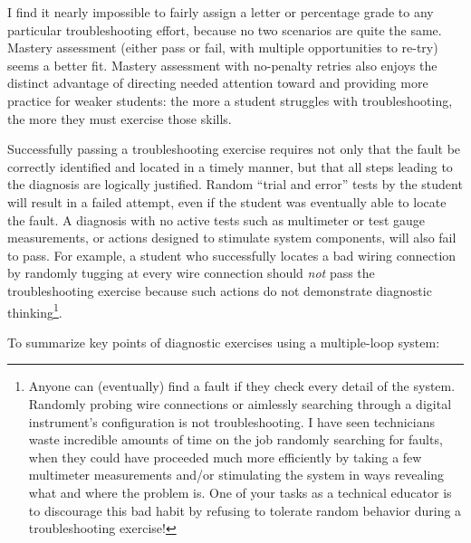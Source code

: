 I find it nearly impossible to fairly assign a letter or percentage grade to any particular troubleshooting effort, because no two scenarios are quite the same.  Mastery assessment (either pass or fail, with multiple opportunities to re-try) seems a better fit.  Mastery assessment with no-penalty retries also enjoys the distinct advantage of directing needed attention toward and providing more practice for weaker students: the more a student struggles with troubleshooting, the more they must exercise those skills.  

Successfully passing a troubleshooting exercise requires not only that the fault be correctly identified and located in a timely manner, but that all steps leading to the diagnosis are logically justified.  Random ``trial and error'' tests by the student will result in a failed attempt, even if the student was eventually able to locate the fault.  A diagnosis with no active tests such as multimeter or test gauge measurements, or actions designed to stimulate system components, will also fail to pass.  For example, a student who successfully locates a bad wiring connection by randomly tugging at every wire connection should \textit{not} pass the troubleshooting exercise because such actions do not demonstrate diagnostic thinking\footnote{Anyone can (eventually) find a fault if they check every detail of the system.  Randomly probing wire connections or aimlessly searching through a digital instrument's configuration is not troubleshooting.  I have seen technicians waste incredible amounts of time on the job randomly searching for faults, when they could have proceeded much more efficiently by taking a few multimeter measurements and/or stimulating the system in ways revealing what and where the problem is.  One of your tasks as a technical educator is to discourage this bad habit by refusing to tolerate random behavior during a troubleshooting exercise!}.

\vskip 10pt

To summarize key points of diagnostic exercises using a multiple-loop system:

